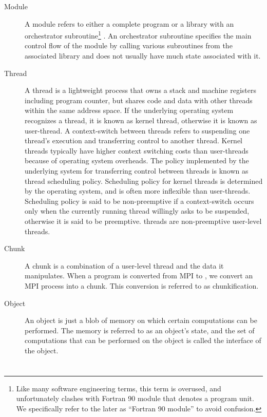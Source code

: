 \documentclass[10pt]{article}
\begin{document}
\begin{description}

\item[Module] A module refers to either a complete program or a library with an
orchestrator subroutine\footnote{Like many software engineering terms, this
term is overused, and unfortunately clashes with Fortran 90 module that denotes
a program unit. We specifically refer to the later as ``Fortran 90 module'' to
avoid confusion.} . An orchestrator subroutine specifies the main control flow
of the module by calling various subroutines from the associated library and
does not usually have much state associated with it.

\item[Thread] A thread is a lightweight process that owns a stack and machine
registers including program counter, but shares code and data with other
threads within the same address space. If the underlying operating system
recognizes a thread, it is known as kernel thread, otherwise it is known as
user-thread. A context-switch between threads refers to suspending one thread's
execution and transferring control to another thread. Kernel threads typically
have higher context switching costs than user-threads because of operating
system overheads. The policy implemented by the underlying system for
transferring control between threads is known as thread scheduling policy.
Scheduling policy for kernel threads is determined by the operating system, and
is often more inflexible than user-threads. Scheduling policy is said to be
non-preemptive if a context-switch occurs only when the currently running
thread willingly asks to be suspended, otherwise it is said to be preemptive.
\ampi{} threads are non-preemptive user-level threads.

\item[Chunk] A chunk is a combination of a user-level thread and the data it
manipulates. When a program is converted from MPI to \ampi{}, we convert an MPI
process into a chunk. This conversion is referred to as chunkification.

\item[Object] An object is just a blob of memory on which certain computations
can be performed. The memory is referred to as an object's state, and the set
of computations that can be performed on the object is called the interface of
the object.

\end{description}

\section{\charmpp{}}
\end{document}
